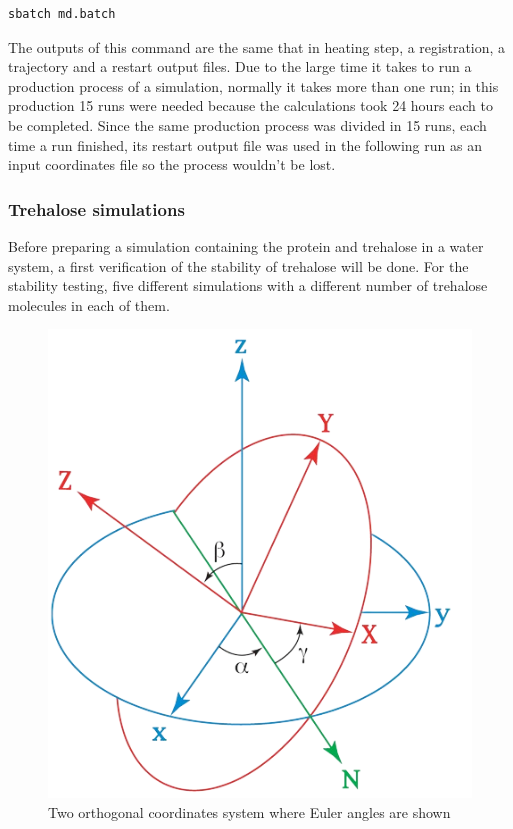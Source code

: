 \documentclass[a4paper]{article}
\begin{document}
\begin{lstlisting}[language=Bash,caption={Submitting job into supercomputer}]
    sbatch md.batch
\end{lstlisting}

The outputs of this command are the same that in heating step, a registration, a trajectory and a restart output files. Due to the large time it takes to run a production process of a simulation, normally it takes more than one run; in this production 15 runs were needed because the calculations took 24 hours each to be completed. Since the same production process was divided in 15 runs, each time a run finished, its restart output file was used in the following run as an input coordinates file so the process wouldn't be lost.


\subsubsection{Trehalose simulations}

Before preparing a simulation containing the protein and trehalose in a water system, a first verification of the stability of trehalose will be done. For the stability testing, five different simulations with a different number of trehalose molecules in each of them.


\begin{figure}[h]
    \centering
    \includegraphics[width = 0.4\hsize]{./figures/euler}
    \caption{Two orthogonal coordinates system where Euler angles are shown }
    \label{fig:euler}
\end{figure}
\end{document}
